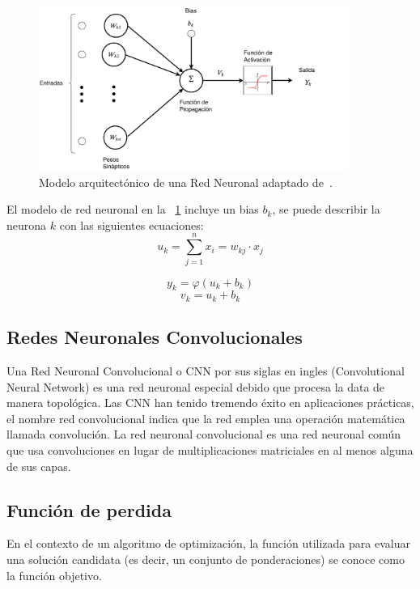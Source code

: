\begin{figure}[H]
  \centering
    \includegraphics[width=0.9\textwidth]{images/redNeuronal.pdf}
  \caption[Arquitectura general Red Neuronal]{Modelo arquitectónico de una Red Neuronal adaptado de~\cite{Haykin1994}.}
  \label{figure:RedNeuronal}
\end{figure}

El modelo de red neuronal en la \figurename~\ref{figure:RedNeuronal} incluye un bias $b_{k}$, se puede describir la neurona $k$ con las siguientes ecuaciones:
\begin{equation}
  u_{k} = \sum_{j=1}^{n}x_{i} = w_{kj} \cdot x_{j}   
\end{equation}

\begin{equation}
  y_{k} =\varphi (u_{k}+b_{k})  
\end{equation}
\begin{equation}
  v_{k} = u_{k}+b_{k}  
\end{equation}

\subsection{Redes Neuronales Convolucionales}
 Una Red Neuronal Convolucional o \gls{CNN} por sus siglas en ingles (Convolutional Neural Network) es una red neuronal especial debido que procesa la data de manera topológica. Las \gls{CNN} han tenido tremendo éxito en aplicaciones prácticas, el nombre red convolucional  indica que la red emplea una operación matemática llamada convolución. La red neuronal convolucional es una red neuronal común que usa convoluciones en lugar de multiplicaciones matriciales en al menos alguna de sus capas.
\subsection{Función de perdida}
En el contexto de un algoritmo de optimización, la función utilizada para evaluar una solución candidata (es decir, un conjunto de ponderaciones) se conoce como la función objetivo.

